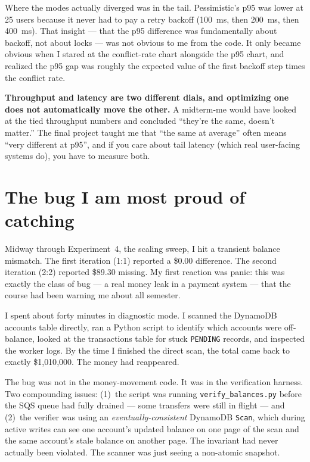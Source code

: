 \documentclass[11pt,a4paper]{article}
\begin{document}
Where the modes actually diverged was in the tail. Pessimistic's p95 was lower at 25 users because it never had to pay a retry backoff (100~ms, then 200~ms, then 400~ms). That insight --- that the p95 difference was fundamentally about backoff, not about locks --- was not obvious to me from the code. It only became obvious when I stared at the conflict-rate chart alongside the p95 chart, and realized the p95 gap was roughly the expected value of the first backoff step times the conflict rate.

\begin{insightbox}
\textbf{Throughput and latency are two different dials, and optimizing one does not automatically move the other.} A midterm-me would have looked at the tied throughput numbers and concluded ``they're the same, doesn't matter.'' The final project taught me that ``the same at average'' often means ``very different at p95'', and if you care about tail latency (which real user-facing systems do), you have to measure both.
\end{insightbox}

\section{The bug I am most proud of catching}

Midway through Experiment~4, the scaling sweep, I hit a transient balance mismatch. The first iteration (1:1) reported a \$0.00 difference. The second iteration (2:2) reported \$89.30 missing. My first reaction was panic: this was exactly the class of bug --- a real money leak in a payment system --- that the course had been warning me about all semester.

I spent about forty minutes in diagnostic mode. I scanned the DynamoDB accounts table directly, ran a Python script to identify which accounts were off-balance, looked at the transactions table for stuck \texttt{PENDING} records, and inspected the worker logs. By the time I finished the direct scan, the total came back to exactly \$1{,}010{,}000. The money had reappeared.

The bug was not in the money-movement code. It was in the verification harness. Two compounding issues: (1)~the script was running \texttt{verify\_balances.py} before the SQS queue had fully drained --- some transfers were still in flight --- and (2)~the verifier was using an \textit{eventually-consistent} DynamoDB \texttt{Scan}, which during active writes can see one account's updated balance on one page of the scan and the same account's stale balance on another page. The invariant had never actually been violated. The scanner was just seeing a non-atomic snapshot.
\end{document}
